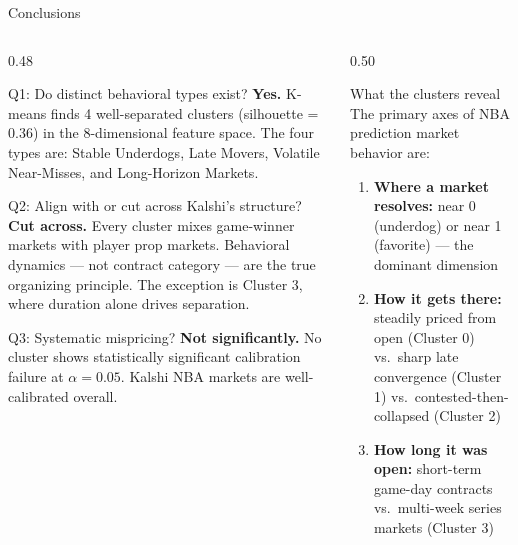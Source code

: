 \documentclass[10pt, aspectratio=169]{beamer}
\begin{document}
\begin{frame}{Conclusions}
  \begin{columns}[T]
    \begin{column}{0.48\textwidth}
      \begin{alertblock}{Q1: Do distinct behavioral types exist?}
        \textbf{Yes.} K-means finds 4 well-separated clusters
        (silhouette = 0.36) in the 8-dimensional feature space.
        The four types are: Stable Underdogs, Late Movers,
        Volatile Near-Misses, and Long-Horizon Markets.
      \end{alertblock}

      \medskip
      \begin{alertblock}{Q2: Align with or cut across Kalshi's structure?}
        \textbf{Cut across.} Every cluster mixes game-winner
        markets with player prop markets. Behavioral
        dynamics --- not contract category --- are the true
        organizing principle. The exception is Cluster 3,
        where duration alone drives separation.
      \end{alertblock}

      \medskip
      \begin{alertblock}{Q3: Systematic mispricing?}
        \textbf{Not significantly.} No cluster shows
        statistically significant calibration failure
        at $\alpha=0.05$. Kalshi NBA markets are
        well-calibrated overall.
      \end{alertblock}
    \end{column}
    \begin{column}{0.50\textwidth}
      \begin{block}{What the clusters reveal}
        The primary axes of NBA prediction market behavior are:
        \begin{enumerate}
          \item \textbf{Where a market resolves:} near 0 (underdog)
                or near 1 (favorite) --- the dominant dimension
          \item \textbf{How it gets there:} steadily priced from
                open (Cluster 0) vs.\ sharp late convergence
                (Cluster 1) vs.\ contested-then-collapsed
                (Cluster 2)
          \item \textbf{How long it was open:} short-term
                game-day contracts vs.\ multi-week
                series markets (Cluster 3)
        \end{enumerate}
      \end{block}


\end{column}
\end{columns}
\end{frame}
\end{document}
